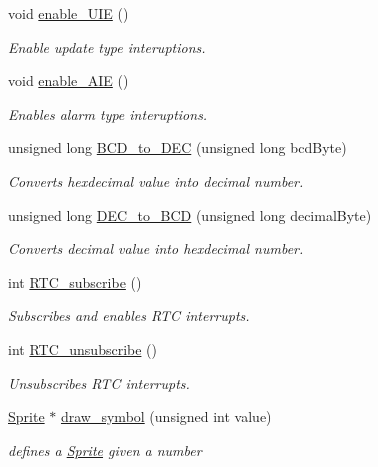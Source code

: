 \begin{DoxyCompactItemize}
void \hyperlink{group___r_t_c_gacebb2833d37346092edc5e0afc97b592}{enable\-\_\-\-U\-I\-E} ()
\begin{DoxyCompactList}\small\item\em Enable update type interuptions. \end{DoxyCompactList}\item 
void \hyperlink{group___r_t_c_gadaa691bf67f507af8b1b68f0335009e4}{enable\-\_\-\-A\-I\-E} ()
\begin{DoxyCompactList}\small\item\em Enables alarm type interuptions. \end{DoxyCompactList}\item 
unsigned long \hyperlink{group___r_t_c_gaa6a08f447e58dc24bbeac381b9fdd038}{B\-C\-D\-\_\-to\-\_\-\-D\-E\-C} (unsigned long bcd\-Byte)
\begin{DoxyCompactList}\small\item\em Converts hexdecimal value into decimal number. \end{DoxyCompactList}\item 
unsigned long \hyperlink{group___r_t_c_gac018c31dc932482fee0a89247dae3fab}{D\-E\-C\-\_\-to\-\_\-\-B\-C\-D} (unsigned long decimal\-Byte)
\begin{DoxyCompactList}\small\item\em Converts decimal value into hexdecimal number. \end{DoxyCompactList}\item 
int \hyperlink{group___r_t_c_gacbf50e9a6491a186e92347d30b0d94f3}{R\-T\-C\-\_\-subscribe} ()
\begin{DoxyCompactList}\small\item\em Subscribes and enables R\-T\-C interrupts. \end{DoxyCompactList}\item 
int \hyperlink{group___r_t_c_ga99496fe6120fa2e61fa65ab69907b0ea}{R\-T\-C\-\_\-unsubscribe} ()
\begin{DoxyCompactList}\small\item\em Unsubscribes R\-T\-C interrupts. \end{DoxyCompactList}\item 
\hyperlink{struct_sprite}{Sprite} $\ast$ \hyperlink{group___r_t_c_ga8e3ed6544fe9da2be7e8982f591ad62c}{draw\-\_\-symbol} (unsigned int value)
\begin{DoxyCompactList}\small\item\em defines a \hyperlink{struct_sprite}{Sprite} given a number \end{DoxyCompactList}\item 

\end{DoxyCompactItemize}
